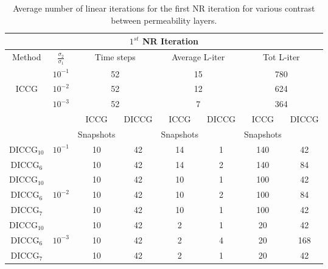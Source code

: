 \documentclass[12pt]{article}
\begin{document}
\begin{table}[!ht]\centering
\begin{minipage}{1\textwidth}
\vspace{-10pt}
\centering
\begin{tabular}{ |c|c|c|c|c|c|c|c|} 
  \hline
 \multicolumn{8}{|c|}{$1^{st}$ NR Iteration}  \\
\hline
Method& $\frac{\sigma_2}{\sigma_1}$ & \multicolumn{2}{|c|}{Time steps} &\multicolumn{2}{|c|}{Average L-iter} & \multicolumn{2}{|c|}{Tot L-iter}\\
\hline
&$10^{-1}$ &\multicolumn{2}{|c|}{52} & \multicolumn{2}{|c|}{15}& \multicolumn{2}{|c|}{780} \\
ICCG&$10^{-2}$ & \multicolumn{2}{|c|}{52}& \multicolumn{2}{|c|}{12}& \multicolumn{2}{|c|}{624}\\
&$10^{-3}$ & \multicolumn{2}{|c|}{52} &\multicolumn{2}{|c|}{7} & \multicolumn{2}{|c|}{364}\\
\hline
&&ICCG&DICCG&ICCG&DICCG&ICCG&DICCG\\
&&Snapshots&&Snapshots&&Snapshots&\\
\hline
DICCG$_{10}$&$10^{-1}$ &10&42 &14&1 &140&42 \\
DICCG$_6$& &10&42 &14&2 &140&84 \\
\hline
DICCG$_{10}$& &10&42 & 10&1& 100&42\\
DICCG$_6$&$10^{-2}$ &10&42 & 10&2& 100&84\\
DICCG$_7$& &10&42 & 10&1& 100&42\\
\hline
DICCG$_{10}$& & 10&42 & 2&1&20&42 \\
DICCG$_6$&$10^{-3}$ & 10&42 & 2&4&20&168 \\
DICCG$_7$& & 10&42 & 2&1&20&42 \\
 \hline
 \end{tabular}
\caption{Average number of linear iterations for the first NR iteration for various contrast between permeability layers. }\label{table:liter1}
\end{minipage}
\end{table}
\end{document}
